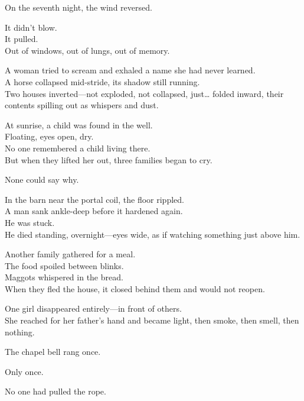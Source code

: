 \documentclass[9pt]{article}
\begin{document}
On the seventh night, the wind reversed.

\vspace{0.5em}
It didn’t blow.\\
It pulled.\\
Out of windows, out of lungs, out of memory.

\vspace{0.5em}
A woman tried to scream and exhaled a name she had never learned.\\
A horse collapsed mid-stride, its shadow still running.\\
Two houses inverted---not exploded, not collapsed, just\ldots{} folded inward, their contents spilling out as whispers and dust.

\vspace{0.5em}
At sunrise, a child was found in the well.\\
Floating, eyes open, dry.\\
No one remembered a child living there.\\
But when they lifted her out, three families began to cry.

\vspace{0.5em}
None could say why.

\vspace{0.5em}
In the barn near the portal coil, the floor rippled.\\
A man sank ankle-deep before it hardened again.\\
He was stuck.\\
He died standing, overnight---eyes wide, as if watching something just above him.

\vspace{0.5em}
Another family gathered for a meal.\\
The food spoiled between blinks.\\
Maggots whispered in the bread.\\
When they fled the house, it closed behind them and would not reopen.

\vspace{0.5em}
One girl disappeared entirely---in front of others.\\
She reached for her father’s hand and became light, then smoke, then smell, then nothing.

\vspace{0.5em}
The chapel bell rang once.

\vspace{0.5em}
Only once.

\vspace{0.5em}
No one had pulled the rope.
\end{document}
